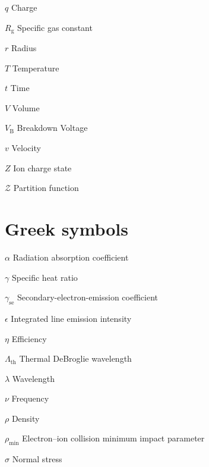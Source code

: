 \begin{multicols}{2}
\begin{nomlist}
        \item[$q$]              Charge
        \item[$R_\mathrm{g}$]   Specific gas constant
        \item[$r$]              Radius 
        \item[$T$]              Temperature
        \item[$t$]              Time
        \item[$V$]              Volume
        \item[$V_\mathrm{B}$]   Breakdown Voltage
        \item[$v$]              Velocity
        \item[$Z$]              Ion charge state
        \item[$\mathcal{Z}$]    Partition function
    \end{nomlist}

    \section*{Greek symbols}
    \begin{nomlist}
        \item[$\alpha$]         Radiation absorption coefficient %
        \item[$\gamma$]         Specific heat ratio
        \item[$\gamma_\mathrm{se}$]         Secondary-electron-emission coefficient
        \item[$\epsilon$]       Integrated line emission intensity 
        \item[$\eta$]           Efficiency 
        \item[$\Lambda_\mathrm{th}$]        Thermal DeBroglie wavelength
        \item[$\lambda$]        Wavelength
        \item[$\nu$]            Frequency
        \item[$\rho$]           Density
        \item[$\rho_\mathrm{min}$]  Electron--ion collision minimum impact parameter
        \item[$\sigma$]         Normal stress
    \end{nomlist}


\end{multicols}
